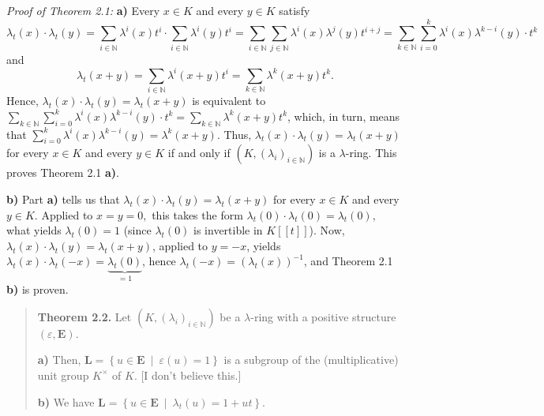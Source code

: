 \documentclass[12pt,final,notitlepage,onecolumn,german]{article}%
\begin{document}
\textit{Proof of Theorem 2.1:} \textbf{a)} Every $x\in K$ and every $y\in K$
satisfy%
\[
\lambda_{t}\left(  x\right)  \cdot\lambda_{t}\left(  y\right)  =\sum
\limits_{i\in\mathbb{N}}\lambda^{i}\left(  x\right)  t^{i}\cdot\sum
\limits_{i\in\mathbb{N}}\lambda^{i}\left(  y\right)  t^{i}=\sum\limits_{i\in
\mathbb{N}}\sum\limits_{j\in\mathbb{N}}\lambda^{i}\left(  x\right)
\lambda^{j}\left(  y\right)  t^{i+j}=\sum_{k\in\mathbb{N}}\sum_{i=0}%
^{k}\lambda^{i}\left(  x\right)  \lambda^{k-i}\left(  y\right)  \cdot t^{k}%
\]
and%
\[
\lambda_{t}\left(  x+y\right)  =\sum_{i\in\mathbb{N}}\lambda^{i}\left(
x+y\right)  t^{i}=\sum_{k\in\mathbb{N}}\lambda^{k}\left(  x+y\right)  t^{k}.
\]
Hence, $\lambda_{t}\left(  x\right)  \cdot\lambda_{t}\left(  y\right)
=\lambda_{t}\left(  x+y\right)  $ is equivalent to $\sum\limits_{k\in
\mathbb{N}}\sum\limits_{i=0}^{k}\lambda^{i}\left(  x\right)  \lambda
^{k-i}\left(  y\right)  \cdot t^{k}=\sum\limits_{k\in\mathbb{N}}\lambda
^{k}\left(  x+y\right)  t^{k}$, which, in turn, means that $\sum
\limits_{i=0}^{k}\lambda^{i}\left(  x\right)  \lambda^{k-i}\left(  y\right)
=\lambda^{k}\left(  x+y\right)  $. Thus, $\lambda_{t}\left(  x\right)
\cdot\lambda_{t}\left(  y\right)  =\lambda_{t}\left(  x+y\right)  $ for every
$x\in K$ and every $y\in K$ if and only if $\left(  K,\left(  \lambda
_{i}\right)  _{i\in\mathbb{N}}\right)  $ is a $\lambda$-ring. This proves
Theorem 2.1 \textbf{a)}.

\textbf{b)} Part \textbf{a)} tells us that $\lambda_{t}\left(  x\right)
\cdot\lambda_{t}\left(  y\right)  =\lambda_{t}\left(  x+y\right)  $ for every
$x\in K$ and every $y\in K$. Applied to $x=y=0,$ this takes the form
$\lambda_{t}\left(  0\right)  \cdot\lambda_{t}\left(  0\right)  =\lambda
_{t}\left(  0\right)  ,$ what yields $\lambda_{t}\left(  0\right)  =1$ (since
$\lambda_{t}\left(  0\right)  $ is invertible in $K\left[  \left[  t\right]
\right]  $). Now, $\lambda_{t}\left(  x\right)  \cdot\lambda_{t}\left(
y\right)  =\lambda_{t}\left(  x+y\right)  $, applied to $y=-x$, yields
$\lambda_{t}\left(  x\right)  \cdot\lambda_{t}\left(  -x\right)
=\underbrace{\lambda_{t}\left(  0\right)  }_{=1}$, hence $\lambda_{t}\left(
-x\right)  =\left(  \lambda_{t}\left(  x\right)  \right)  ^{-1}$, and Theorem
2.1 \textbf{b)} is proven.

\begin{quote}
\textbf{Theorem 2.2.} Let $\left(  K,\left(  \lambda_{i}\right)
_{i\in\mathbb{N}}\right)  $ be a $\lambda$-ring with a positive structure
$\left(  \varepsilon,\mathbf{E}\right)  .$

\textbf{a)} Then, $\mathbf{L}=\left\{  u\in\mathbf{E}\ \mid\ \varepsilon
\left(  u\right)  =1\right\}  $ is a subgroup of the (multiplicative) unit
group $K^{\times}$ of $K$. [I don't believe this.]

\textbf{b)} We have $\mathbf{L}=\left\{  u\in\mathbf{E}\ \mid\ \lambda
_{t}\left(  u\right)  =1+ut\right\}  $.
\end{quote}
\end{document}
